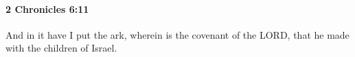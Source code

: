 
		\paragraph{2 Chronicles 6:11} %
			\label{2CHRONICLES-6-11}

			And in it have I put the ark, wherein is the covenant of the LORD, that he made with the children of Israel.


